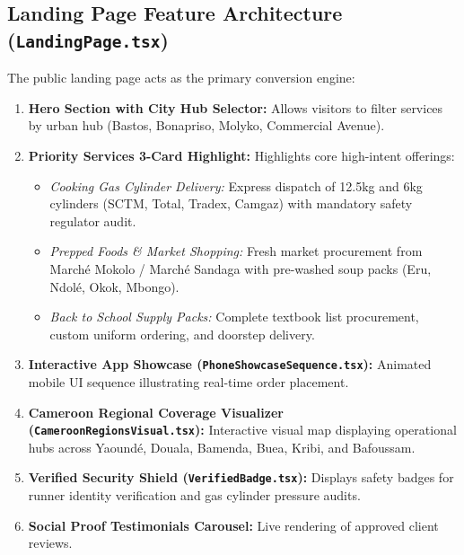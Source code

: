 \documentclass[11pt,a4paper]{article}
\begin{document}
\subsection{Landing Page Feature Architecture (\texttt{LandingPage.tsx})}
The public landing page acts as the primary conversion engine:
\begin{enumerate}
    \item \textbf{Hero Section with City Hub Selector:} Allows visitors to filter services by urban hub (Bastos, Bonapriso, Molyko, Commercial Avenue).
    \item \textbf{Priority Services 3-Card Highlight:} Highlights core high-intent offerings:
    \begin{itemize}
        \item \textit{Cooking Gas Cylinder Delivery:} Express dispatch of 12.5kg and 6kg cylinders (SCTM, Total, Tradex, Camgaz) with mandatory safety regulator audit.
        \item \textit{Prepped Foods \& Market Shopping:} Fresh market procurement from March\'e Mokolo / March\'e Sandaga with pre-washed soup packs (Eru, Ndol\'e, Okok, Mbongo).
        \item \textit{Back to School Supply Packs:} Complete textbook list procurement, custom uniform ordering, and doorstep delivery.
    \end{itemize}
    \item \textbf{Interactive App Showcase (\texttt{PhoneShowcaseSequence.tsx}):} Animated mobile UI sequence illustrating real-time order placement.
    \item \textbf{Cameroon Regional Coverage Visualizer (\texttt{CameroonRegionsVisual.tsx}):} Interactive visual map displaying operational hubs across Yaound\'e, Douala, Bamenda, Buea, Kribi, and Bafoussam.
    \item \textbf{Verified Security Shield (\texttt{VerifiedBadge.tsx}):} Displays safety badges for runner identity verification and gas cylinder pressure audits.
    \item \textbf{Social Proof Testimonials Carousel:} Live rendering of approved client reviews.
\end{enumerate}
\end{document}
